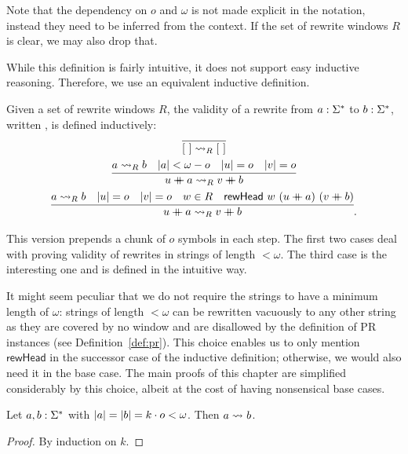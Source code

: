 Note that the dependency on $o$ and $\omega$ is not made explicit in the notation, instead they need to be inferred from the context. If the set of rewrite windows $R$ is clear, we may also drop that.

While this definition is fairly intuitive, it does not support easy inductive reasoning. Therefore, we use an equivalent inductive definition.

\begin{definition}[Validity][valid]
  Given a set of rewrite windows $R$, the validity of a rewrite from $a : \Sigma^*$ to $b : \Sigma^*$, written , is defined inductively:  
  \begin{gather*}
    \infer{\nil \strent{R} \nil}{} \\
    \infer{u\concat{} a \strent{R} v \concat{} b}{a \strent{R} b \quad \length{a} < \omega - o \quad \length{u} = o \quad \length{v} = o} \\
    \infer{u \concat{} a \strent{R} v \concat{} b}{a \strent{R} b \quad \length{u} = o \quad \length{v} = o \quad w \in R \quad \rewHead{w}{(u\concat{}a)}{(v \concat{} b)}}.
  \end{gather*}
\end{definition}

This version prepends a chunk of $o$ symbols in each step. The first two cases deal with proving validity of rewrites in strings of length $< \omega$. The third case is the interesting one and is defined in the intuitive way.

\begin{remark}\label{rem:vacuous}
  It might seem peculiar that we do not require the strings to have a minimum length of $\omega$: strings of length $< \omega$ can be rewritten vacuously to any other string as they are covered by no window and are disallowed by the definition of PR instances (see Definition~\ref{def:pr}). 
  This choice enables us to only mention $\textsf{rewHead}$ in the successor case of the inductive definition; otherwise, we would also need it in the base case. The main proofs of this chapter are simplified considerably by this choice, albeit at the cost of having nonsensical base cases.
\end{remark}

\begin{proposition}\label{lem:vacuous}
  Let $a, b : \Sigma^*$ with $|a| = |b| = k \cdot o < \omega$. Then $a \rightsquigarrow_{} b$. 
\end{proposition}
\begin{proof}
  By induction on $k$.
\end{proof}

